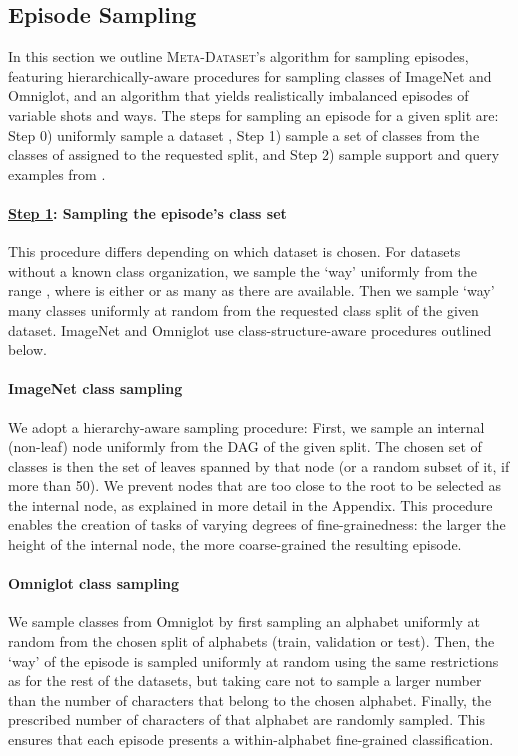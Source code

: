 \documentclass{article} \usepackage{iclr2020_conference,times}
\newcommand{\benchmark}{\textsc{Meta-Dataset}\xspace}
\begin{document}
\subsection{Episode Sampling} In this section we outline \benchmark's algorithm for sampling episodes, featuring hierarchically-aware procedures for sampling classes of ImageNet and Omniglot, and an algorithm that yields realistically imbalanced episodes of variable shots and ways. 
The steps for sampling an episode for a given split are: Step 0) uniformly sample a dataset , Step 1) sample a set of classes  from the classes of  assigned to the requested split, and Step 2) sample support and query examples from .

\paragraph{\underline{Step 1}: Sampling the episode's class set} This procedure differs depending
on which dataset is chosen. For datasets without a known class organization, we
sample the `way' uniformly from the range , where
 is either  or as many as there are available. Then
we sample `way' many classes uniformly at random from the requested class split
of the given dataset. ImageNet and Omniglot use class-structure-aware procedures outlined below.

\paragraph{ImageNet class sampling} We adopt a hierarchy-aware sampling
procedure: First, we sample an internal (non-leaf) node uniformly
from the DAG of the given split. The chosen set of classes is
then the set of leaves spanned by that node (or a random subset of it, if more than 50).
We prevent nodes that are too close to the root to be selected as the internal node, 
as explained in more detail in the Appendix. This procedure enables the creation of tasks of varying degrees of
fine-grainedness: the larger the height of the internal node, the more coarse-grained the resulting episode.

\paragraph{Omniglot class sampling} We sample classes from Omniglot by first
sampling an alphabet uniformly at random from the chosen split of alphabets
(train, validation or test). Then, the `way' of the episode is sampled
uniformly at random using the same restrictions as for the rest of the
datasets, but taking care not to sample a larger number than the number of
characters that belong to the chosen alphabet. Finally, the prescribed number
of characters of that alphabet are randomly sampled. This ensures that each
episode presents a within-alphabet fine-grained classification.
\end{document}
